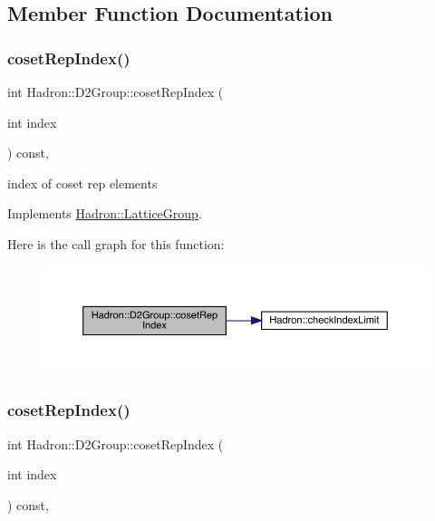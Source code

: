 \subsection{Member Function Documentation}
\mbox{\label{structHadron_1_1D2Group_a41bfcefe5a659b99db790f822123593f}} 
\subsubsection{\texorpdfstring{cosetRepIndex()}{cosetRepIndex()}\hspace{0.1cm}{\footnotesize\ttfamily [1/3]}}
{\footnotesize\ttfamily int Hadron\+::\+D2\+Group\+::coset\+Rep\+Index (\begin{DoxyParamCaption}\item[{int}]{index }\end{DoxyParamCaption}) const\hspace{0.3cm}{\ttfamily [inline]}, {\ttfamily [virtual]}}

index of coset rep elements 

Implements \mbox{\hyperlink{structHadron_1_1LatticeGroup_a7e3b9b5e2f596e6c40d64aa939a3ad6c}{Hadron\+::\+Lattice\+Group}}.

Here is the call graph for this function\+:
\nopagebreak
\begin{figure}[H]
\begin{center}
\leavevmode
\includegraphics[width=350pt]{d8/de7/structHadron_1_1D2Group_a41bfcefe5a659b99db790f822123593f_cgraph}
\end{center}
\end{figure}
\mbox{\label{structHadron_1_1D2Group_a41bfcefe5a659b99db790f822123593f}} 
\subsubsection{\texorpdfstring{cosetRepIndex()}{cosetRepIndex()}\hspace{0.1cm}{\footnotesize\ttfamily [2/3]}}
{\footnotesize\ttfamily int Hadron\+::\+D2\+Group\+::coset\+Rep\+Index (\begin{DoxyParamCaption}\item[{int}]{index }\end{DoxyParamCaption}) const\hspace{0.3cm}{\ttfamily [inline]}, {\ttfamily [virtual]}}

